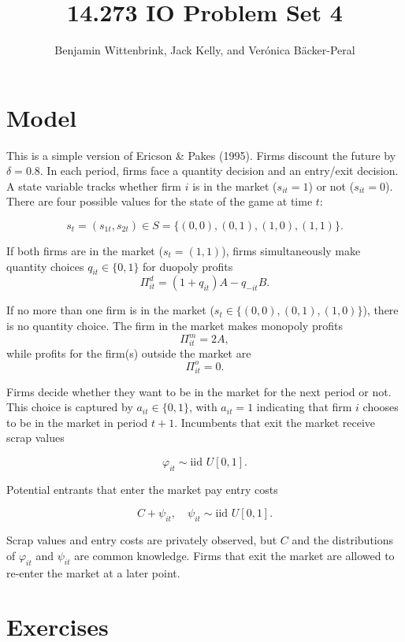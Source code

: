 \documentclass{article}
\title{14.273 IO Problem Set 4}
\author{Benjamin Wittenbrink, Jack Kelly, and Verónica Bäcker-Peral}
\begin{document}
\maketitle
 \section*{Model}

This is a simple version of Ericson \& Pakes (1995). Firms discount the future by $\delta = 0.8$. In each period, firms face a quantity decision and an entry/exit decision. A state variable tracks whether firm $i$ is in the market ($s_{it} = 1$) or not ($s_{it} = 0$). There are four possible values for the state of the game at time $t$:

\[
s_t = (s_{1t}, s_{2t}) \in S = \{(0,0), (0,1), (1,0), (1,1)\}.
\]

If both firms are in the market ($s_t = (1,1)$), firms simultaneously make quantity choices $q_{it} \in \{0,1\}$ for duopoly profits
\[
\Pi^d_{it} = (1 + q_{it})A - q_{-it}B.
\]

If no more than one firm is in the market ($s_t \in \{(0,0), (0,1), (1,0)\}$), there is no quantity choice. The firm in the market makes monopoly profits
\[
\Pi^m_{it} = 2A,
\]
while profits for the firm(s) outside the market are
\[
\Pi^o_{it} = 0.
\]

Firms decide whether they want to be in the market for the next period or not. This choice is captured by $a_{it} \in \{0,1\}$, with $a_{it} = 1$ indicating that firm $i$ chooses to be in the market in period $t+1$. Incumbents that exit the market receive scrap values

\[
\varphi_{it} \sim \text{iid } U[0,1].
\]

Potential entrants that enter the market pay entry costs

\[
C + \psi_{it}, \quad \psi_{it} \sim \text{iid } U[0,1].
\]

Scrap values and entry costs are privately observed, but $C$ and the distributions of $\varphi_{it}$ and $\psi_{it}$ are common knowledge. Firms that exit the market are allowed to re-enter the market at a later point.

\newpage

\section*{Exercises}
\end{document}
